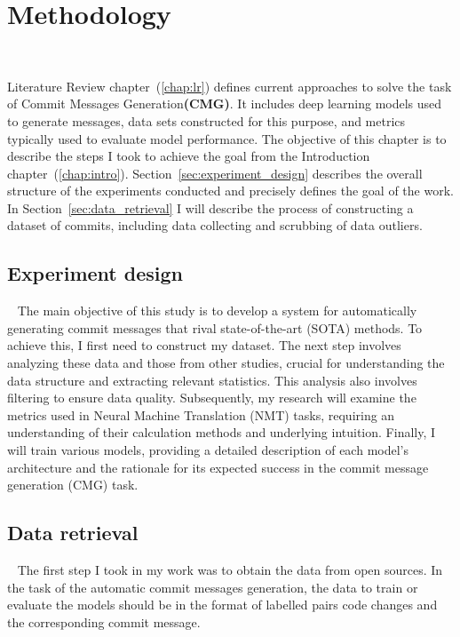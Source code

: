 \chapter{Methodology}~\label{chap:met}

Literature Review chapter~(\ref{chap:lr}) defines current approaches to solve the task of Commit Messages Generation\textbf{(CMG)}. It includes deep learning models used to generate messages, data sets constructed for this purpose, and metrics typically used to evaluate model performance. The objective of this chapter is to describe the steps I took to achieve the goal from the Introduction chapter~(\ref{chap:intro}). Section~\ref{sec:experiment_design} describes the overall structure of the experiments conducted and precisely defines the goal of the work. In Section~\ref{sec:data_retrieval} I will describe the process of constructing a dataset of commits, including data collecting and scrubbing of data outliers.

\section{Experiment design}~\label{sec:experiment_design}
The main objective of this study is to develop a system for automatically generating commit messages that rival state-of-the-art (SOTA) methods. To achieve this, I first need to construct my dataset. The next step involves analyzing these data and those from other studies, crucial for understanding the data structure and extracting relevant statistics. This analysis also involves filtering to ensure data quality. Subsequently, my research will examine the metrics used in Neural Machine Translation (NMT) tasks, requiring an understanding of their calculation methods and underlying intuition. Finally, I will train various models, providing a detailed description of each model's architecture and the rationale for its expected success in the commit message generation (CMG) task.

\section{Data retrieval}~\label{sec:data_retrieval}
The first step I took in my work was to obtain the data from open sources. In the task of the automatic commit messages generation, the data to train or evaluate the models should be in the format of labelled pairs code changes and the corresponding commit message.

